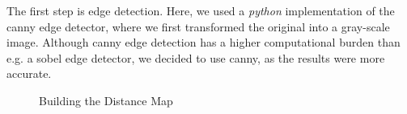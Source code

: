 \documentclass[10pt,conference,compsocconf]{IEEEtran}
\begin{document}
The first step is edge detection. Here, we used a \emph{python} implementation of the canny edge detector, where we first transformed the original into a gray-scale image. Although canny edge detection has a higher computational burden than e.g. a sobel edge detector, we decided to use canny, as the results were more accurate.

\begin{figure}[tp]
	\centering
	\hspace{0.025\linewidth}
	\caption{Building the Distance Map}
\end{figure}
\end{document}

